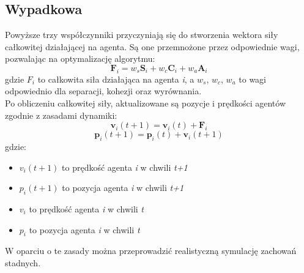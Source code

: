\documentclass[a4paper,12pt]{article}
\begin{document}
\subsection{Wypadkowa}
Powyższe trzy współczynniki przyczyniają się do stworzenia wektora siły całkowitej działającej na agenta. Są one przemnożone przez odpowiednie wagi, pozwalając na optymalizację algorytmu:
\begin{equation}
    \mathbf{F}_i = w_s \mathbf{S}_i + w_c \mathbf{C}_i + w_a \mathbf{A}_i
\end{equation}
gdzie $F_{i}$ to całkowita siła działająca na agenta \textit{i}, a $w_{s}$, $w_{c}$, $w_{a}$ to wagi odpowiednio dla separacji, kohezji oraz wyrównania. \\
Po obliczeniu całkowitej siły, aktualizowane są pozycje i prędkości agentów zgodnie z zasadami dynamiki:
\begin{equation}
    \mathbf{v}_i(t+1) = \mathbf{v}_i(t) + \mathbf{F}_i
\end{equation}
\begin{equation}
    \mathbf{p}_i(t+1) = \mathbf{p}_i(t) + \mathbf{v}_i(t+1)
\end{equation}
gdzie:
\begin{itemize}
    \item $v_{i}(t+1)$ to prędkość agenta \textit{i} w chwili \textit{t+1}
    \item $p_{i}(t+1)$ to pozycja agenta \textit{i} w chwili \textit{t+1}
    \item $v_{i}$ to prędkość agenta \textit{i} w chwili \textit{t}
    \item $p_{i}$ to pozycja agenta \textit{i} w chwili \textit{t}
\end{itemize}
W oparciu o te zasady można przeprowadzić realistyczną symulację zachowań stadnych.
\end{document}
